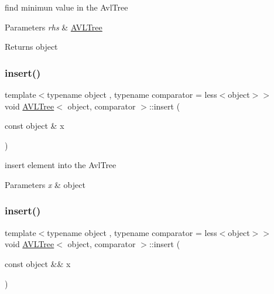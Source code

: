 find minimun value in the Avl\+Tree 


\begin{DoxyParams}{Parameters}
{\em rhs} & \hyperlink{class_a_v_l_tree}{A\+V\+L\+Tree} \\
\hline
\end{DoxyParams}
\begin{DoxyReturn}{Returns}
object 
\end{DoxyReturn}
\hypertarget{class_a_v_l_tree_ae767da0ef324212a6b60d2c735f4546b}{}\label{class_a_v_l_tree_ae767da0ef324212a6b60d2c735f4546b} 
\subsubsection{\texorpdfstring{insert()}{insert()}\hspace{0.1cm}{\footnotesize\ttfamily [1/2]}}
{\footnotesize\ttfamily template$<$typename object , typename comparator  = less$<$object$>$$>$ \\
void \hyperlink{class_a_v_l_tree}{A\+V\+L\+Tree}$<$ object, comparator $>$\+::insert (\begin{DoxyParamCaption}\item[{const object \&}]{x }\end{DoxyParamCaption})\hspace{0.3cm}{\ttfamily [inline]}}



insert element into the Avl\+Tree 


\begin{DoxyParams}{Parameters}
{\em x} & object \\
\hline
\end{DoxyParams}
\hypertarget{class_a_v_l_tree_ac2e624021d1bed72ccccee5bd0eea85c}{}\label{class_a_v_l_tree_ac2e624021d1bed72ccccee5bd0eea85c} 
\subsubsection{\texorpdfstring{insert()}{insert()}\hspace{0.1cm}{\footnotesize\ttfamily [2/2]}}
{\footnotesize\ttfamily template$<$typename object , typename comparator  = less$<$object$>$$>$ \\
void \hyperlink{class_a_v_l_tree}{A\+V\+L\+Tree}$<$ object, comparator $>$\+::insert (\begin{DoxyParamCaption}\item[{const object \&\&}]{x }\end{DoxyParamCaption})\hspace{0.3cm}{\ttfamily [inline]}}



